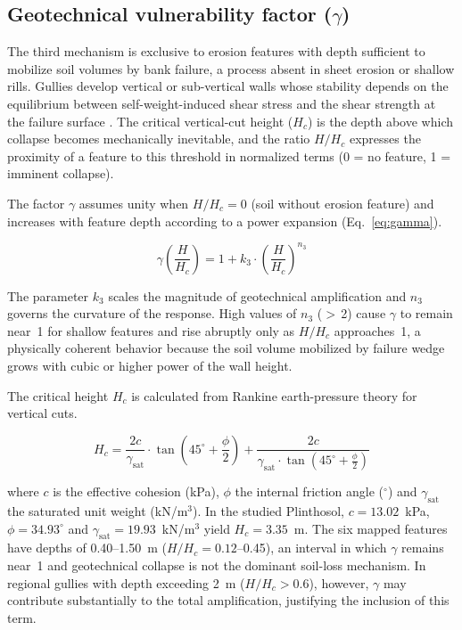 \documentclass[pdflatex,sn-basic,referee,lineno]{sn-jnl}
\begin{document}
\subsection{Geotechnical vulnerability factor (\texorpdfstring{$\gamma$}{gamma})}

The third mechanism is exclusive to erosion features with depth sufficient to mobilize soil volumes by bank failure, a process absent in sheet erosion or shallow rills. Gullies develop vertical or sub-vertical walls whose stability depends on the equilibrium between self-weight-induced shear stress and the shear strength at the failure surface \citep{fredlund_rahardjo_1993}. The critical vertical-cut height ($H_c$) is the depth above which collapse becomes mechanically inevitable, and the ratio $H/H_c$ expresses the proximity of a feature to this threshold in normalized terms (0 = no feature, 1 = imminent collapse).

The factor $\gamma$ assumes unity when $H/H_c = 0$ (soil without erosion feature) and increases with feature depth according to a power expansion (Eq.~\ref{eq:gamma}).

\begin{equation}
\gamma\!\left(\frac{H}{H_c}\right) = 1 + k_3 \cdot \left(\frac{H}{H_c}\right)^{n_3}
\label{eq:gamma}
\end{equation}

The parameter $k_3$ scales the magnitude of geotechnical amplification and $n_3$ governs the curvature of the response. High values of $n_3$ ($>$\,2) cause $\gamma$ to remain near~1 for shallow features and rise abruptly only as $H/H_c$ approaches~1, a physically coherent behavior because the soil volume mobilized by failure wedge grows with cubic or higher power of the wall height.

The critical height $H_c$ is calculated from Rankine earth-pressure theory for vertical cuts.

\begin{equation}
H_c = \frac{2c}{\gamma_{\mathrm{sat}}} \cdot \tan\!\left(45^\circ + \frac{\phi}{2}\right) + \frac{2c}{\gamma_{\mathrm{sat}} \cdot \tan\!\left(45^\circ + \frac{\phi}{2}\right)}
\label{eq:hc}
\end{equation}

\noindent where $c$ is the effective cohesion (kPa), $\phi$ the internal friction angle ($^\circ$) and $\gamma_{\mathrm{sat}}$ the saturated unit weight (kN/m$^3$). In the studied Plinthosol, $c = 13.02$~kPa, $\phi = 34.93^\circ$ and $\gamma_{\mathrm{sat}} = 19.93$~kN/m$^3$ yield $H_c = 3.35$~m. The six mapped features have depths of 0.40--1.50~m ($H/H_c = 0.12$--0.45), an interval in which $\gamma$ remains near~1 and geotechnical collapse is not the dominant soil-loss mechanism. In regional gullies with depth exceeding 2~m ($H/H_c > 0.6$), however, $\gamma$ may contribute substantially to the total amplification, justifying the inclusion of this term.
\end{document}

